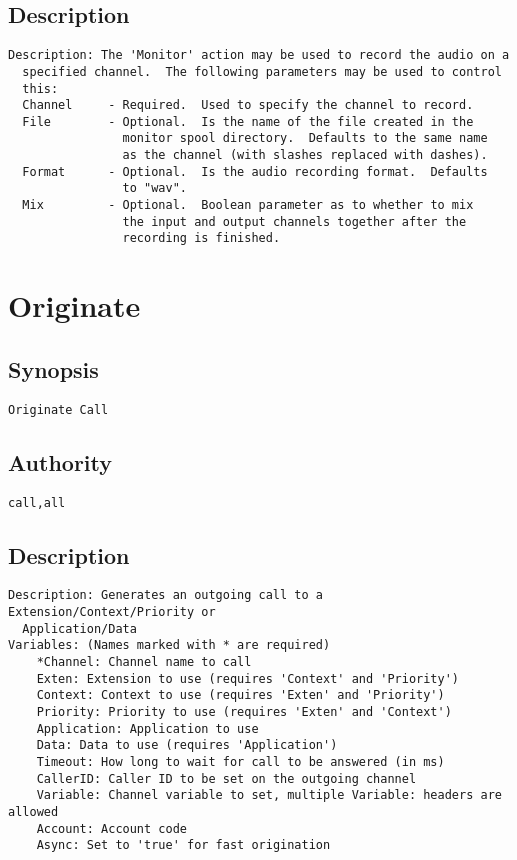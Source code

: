 \subsection{Description}
\begin{verbatim}
Description: The 'Monitor' action may be used to record the audio on a
  specified channel.  The following parameters may be used to control
  this:
  Channel     - Required.  Used to specify the channel to record.
  File        - Optional.  Is the name of the file created in the
                monitor spool directory.  Defaults to the same name
                as the channel (with slashes replaced with dashes).
  Format      - Optional.  Is the audio recording format.  Defaults
                to "wav".
  Mix         - Optional.  Boolean parameter as to whether to mix
                the input and output channels together after the
                recording is finished.

\end{verbatim}


\section{Originate}
\subsection{Synopsis}
\begin{verbatim}
Originate Call
\end{verbatim}
\subsection{Authority}
\begin{verbatim}
call,all
\end{verbatim}
\subsection{Description}
\begin{verbatim}
Description: Generates an outgoing call to a Extension/Context/Priority or
  Application/Data
Variables: (Names marked with * are required)
	*Channel: Channel name to call
	Exten: Extension to use (requires 'Context' and 'Priority')
	Context: Context to use (requires 'Exten' and 'Priority')
	Priority: Priority to use (requires 'Exten' and 'Context')
	Application: Application to use
	Data: Data to use (requires 'Application')
	Timeout: How long to wait for call to be answered (in ms)
	CallerID: Caller ID to be set on the outgoing channel
	Variable: Channel variable to set, multiple Variable: headers are allowed
	Account: Account code
	Async: Set to 'true' for fast origination

\end{verbatim}


